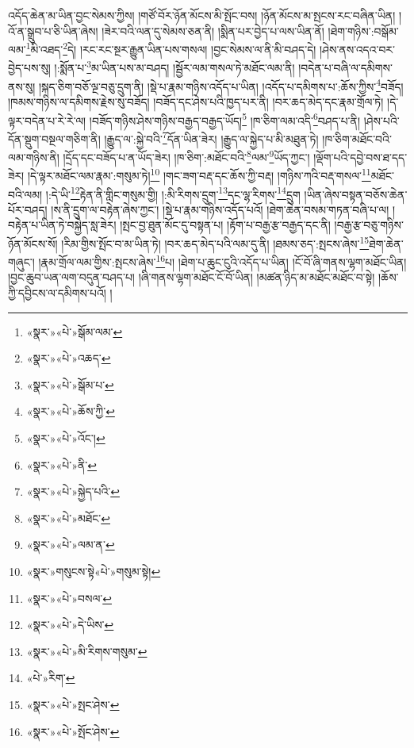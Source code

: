 འདོད་ཆེན་མ་ཡིན་བྱང་སེམས་ཀྱིས། །གཙོ་བོར་ཉོན་མོངས་མི་སྤོང་བས། །ཉོན་མོངས་མ་སྤངས་རང་བཞིན་ཡིན། །འོ་ན་སྒྲུབ་པ་ཅི་ཡིན་ཞེས། །ཟེར་བའི་ལན་དུ་སེམས་ཅན་ནི། །སྨིན་པར་བྱེད་པ་ལས་ཡིན་ནོ། །ཐེག་གཉིས་:བསྒོམ་ལམ་\footnote{«སྣར་»«པེ་»སྒོམ་ལམ་}མི་འཐད་\footnote{«སྣར་»«པེ་»འཆད་}དེ། །རང་རང་སྔར་རྒྱུན་ཡིན་པས་གསལ། །བྱང་སེམས་ལ་ནི་མི་བཤད་དེ། །ཤེས་ནས་འདའ་བར་བྱེད་པས་སུ། །:སྨོན་པ་\footnote{«སྣར་»«པེ་»སྒོམ་པ་}མ་ཡིན་པས་མ་བཤད། །སྦྱོར་ལམ་གསལ་ཏེ་མཐོང་ལམ་ནི། །བདེན་པ་བཞི་ལ་དམིགས་ནས་སུ། །སྐད་ཅིག་བཅོ་ལྔ་བཅུ་དྲུག་ནི། །སྡེ་པ་རྣམ་གཉིས་འདོད་པ་ཡིན། །འདོད་པ་དམིགས་པ་:ཆོས་ཀྱིས་\footnote{«སྣར་»«པེ་»ཆོས་ཀྱི་}བཟོད། །ཁམས་གཉིས་ལ་དམིགས་རྗེས་སུ་བཟོད། །བཟོད་དང་ཤེས་པའི་ཁྱད་པར་ནི། །བར་ཆད་མེད་དང་རྣམ་གྲོལ་ཏེ། །དེ་ལྟར་བདེན་པ་རེ་རེ་ལ། །བཟོད་གཉིས་ཤེས་གཉིས་བརྒྱད་བརྒྱད་ཡོད།\footnote{«སྣར་»«པེ་»འོང་།} །ཁ་ཅིག་ལམ་འདི་\footnote{«སྣར་»«པེ་»ནི་}བཤད་པ་ནི། །ཤེས་པའི་དོན་སྡུག་བསྔལ་གཅིག་ནི། །རྒྱུད་ལ་:སྐྱེ་བའི་\footnote{«སྣར་»«པེ་»སྐྱེད་པའི་}དོན་ཡིན་ཟེར། །རྒྱུད་ལ་སྐྱེད་པ་མི་མཐུན་ཏེ། །ཁ་ཅིག་མཐོང་བའི་ལམ་གཉིས་ནི། །དྲོད་དང་བཟོད་པ་ན་ཡོད་ཟེར། །ཁ་ཅིག་:མཐོང་བའི་\footnote{«སྣར་»«པེ་»མཐོང་}ལམ་\footnote{«སྣར་»«པེ་»ལམ་ན་}ཡོད་ཀྱང་། །ལྡོག་པའི་དབྱེ་བས་ཐ་དད་ཟེར། །དེ་ལྟར་མཐོང་ལམ་རྣམ་:གསུམ་ཏེ།\footnote{«སྣར་»གསུངས་སྟེ«པེ་»གསུམ་སྟེ།} །གང་ཟག་བརྡ་དང་ཆོས་ཀྱི་བརྡ། །གཉིས་ཀའི་བརྡ་གསལ་\footnote{«སྣར་»«པེ་»བསལ་}མཐོང་བའི་ལམ། །:དེ་ཡི་\footnote{«སྣར་»«པེ་»དེ་ཡིས་}རྟེན་ནི་གླིང་གསུམ་གྱི། །:མི་རིགས་དྲུག་\footnote{«སྣར་»«པེ་»མི་རིགས་གསུམ་}དང་ལྷ་རིགས་\footnote{«པེ་»རིག་}དྲུག །ཡིན་ཞེས་བསྟན་བཅོས་ཆེན་པོར་བཤད། །ས་ནི་དྲུག་ལ་བརྟེན་ཞེས་ཀྱང་། །སྡེ་པ་རྣམ་གཉིས་འདོད་པའོ། །ཐེག་ཆེན་བསམ་གཏན་བཞི་པ་ལ། །བརྟེན་པ་ཡིན་ཏེ་བསྐྱེད་སླ་ཟེར། །སྤང་བྱ་ཐུན་མོང་དུ་བསྟན་པ། །རྟོག་པ་བརྒྱ་རྩ་བརྒྱད་དང་ནི། །བརྒྱ་རྩ་བཅུ་གཉིས་ཉོན་མོངས་སོ། །རིམ་གྱིས་སྤོང་བ་མ་ཡིན་ཏེ། །བར་ཆད་མེད་པའི་ལམ་དུ་ནི། །ཐམས་ཅད་:སྤངས་ཞེས་\footnote{«སྣར་»«པེ་»སྤང་ཤེས་}ཐེག་ཆེན་གཞུང་། །རྣམ་གྲོལ་ལམ་གྱིས་:སྤངས་ཞེས་\footnote{«སྣར་»«པེ་»སྤོང་ཤེས་}པ། །ཐེག་པ་ཆུང་ངུའི་འདོད་པ་ཡིན། །ངོ་བོ་ཞི་གནས་ལྷག་མཐོང་ཡིན། །བྱང་ཆུབ་ཡན་ལག་བདུན་བཤད་པ། །ཞི་གནས་ལྷག་མཐོང་ངོ་བོ་ཡིན། །མཚན་ཉིད་མ་མཐོང་མཐོང་བ་སྟེ། །ཆོས་ཀྱི་དབྱིངས་ལ་དམིགས་པའོ། །
